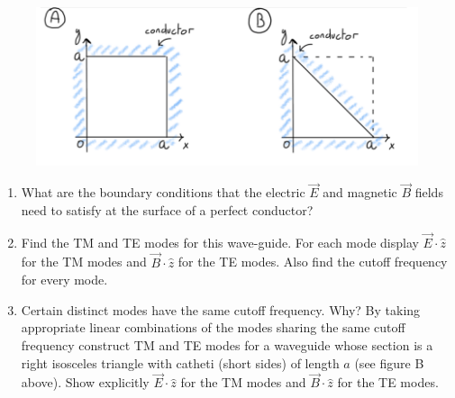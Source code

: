 \begin{figure}[h]
	\includegraphics[width=12cm]{figures/examoct20p4.png}
	\centering
\end{figure}
\begin{enumerate}
	\item What are the boundary conditions that the electric $\vec{E}$ and magnetic $\vec{B}$ fields need to
	satisfy at the surface of a perfect conductor?
	\item Find the TM and TE modes for this wave-guide. For each mode display $\vec{E} \cdot \hat{z}$ for the TM modes and $\vec{B} \cdot \hat{z}$ for the TE modes. Also find the cutoff frequency for every mode.
	\item Certain distinct modes have the same cutoff frequency. Why? By taking appropriate linear combinations of the modes sharing the same cutoff frequency construct TM and TE modes for a waveguide whose section is a right isosceles triangle with catheti (short sides) of length $a$ (see figure B above). Show explicitly $\vec{E} \cdot \hat{z}$ for the TM modes and $\vec{B} \cdot \hat{z}$ for the TE modes.
\end{enumerate}

